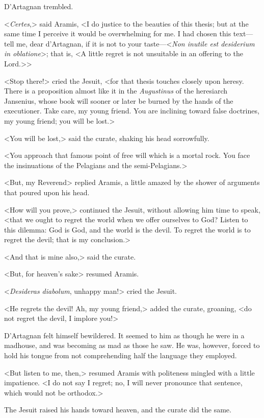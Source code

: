D'Artagnan trembled. 

<\textit{Certes},> said Aramis, <I do justice to the beauties of this thesis; but at the same time I perceive it would be overwhelming for me. I had chosen this text---tell me, dear d'Artagnan, if it is not to your taste---<\textit{Non inutile est desiderium in oblatione}>; that is, <A little regret is not unsuitable in an offering to the Lord.>> 

<Stop there!> cried the Jesuit, <for that thesis touches closely upon heresy. There is a proposition almost like it in the \textit{Augustinus} of the heresiarch Jansenius, whose book will sooner or later be burned by the hands of the executioner. Take care, my young friend. You are inclining toward false doctrines, my young friend; you will be lost.> 

<You will be lost,> said the curate, shaking his head sorrowfully. 

<You approach that famous point of free will which is a mortal rock. You face the insinuations of the Pelagians and the semi-Pelagians.> 

<But, my Reverend\longdash> replied Aramis, a little amazed by the shower of arguments that poured upon his head. 

<How will you prove,> continued the Jesuit, without allowing him time to speak, <that we ought to regret the world when we offer ourselves to God? Listen to this dilemma: God is God, and the world is the devil. To regret the world is to regret the devil; that is my conclusion.> 

<And that is mine also,> said the curate. 

<But, for heaven's sake\longdash> resumed Aramis. 

<\textit{Desideras diabolum}, unhappy man!> cried the Jesuit. 

<He regrets the devil! Ah, my young friend,> added the curate, groaning, <do not regret the devil, I implore you!> 

D'Artagnan felt himself bewildered. It seemed to him as though he were in a madhouse, and was becoming as mad as those he saw. He was, however, forced to hold his tongue from not comprehending half the language they employed. 

<But listen to me, then,> resumed Aramis with politeness mingled with a little impatience. <I do not say I regret; no, I will never pronounce that sentence, which would not be orthodox.> 

The Jesuit raised his hands toward heaven, and the curate did the same. 

